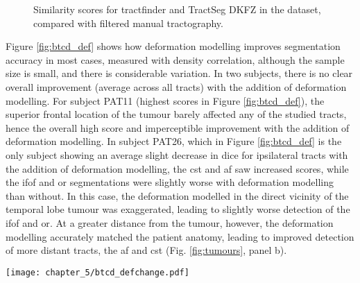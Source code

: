 \begin{figure}[htb!]
  \caption[Similarity scores against tractography for tractfinder and TractSeg in the BTC dataset]{Similarity scores for tractfinder and TractSeg DKFZ in the  dataset, compared with filtered manual tractography.}
  \label{fig:btcd_box}
\end{figure}

Figure \ref{fig:btcd_def} shows how deformation modelling improves segmentation accuracy in most cases, measured with density correlation, although the sample size is small, and there is considerable variation.
In two subjects, there is no clear overall improvement (average across all tracts) with the addition of deformation modelling.
For subject PAT11 (highest scores in Figure \ref{fig:btcd_def}), the superior frontal location of the tumour barely affected any of the studied tracts, hence the overall high score and imperceptible improvement with the addition of deformation modelling.
In subject PAT26, which in Figure \ref{fig:btcd_def} is the only subject showing an average slight decrease in \gls{dice} for ipsilateral tracts with the addition of deformation modelling, the \gls{cst} and \gls{af} saw increased scores, while the \gls{ifof} and \gls{or} segmentations were slightly worse with deformation modelling than without.
In this case, the deformation modelled in the direct vicinity of the temporal lobe tumour was exaggerated, leading to slightly worse detection of the \gls{ifof} and \gls{or}.
At a greater distance from the tumour, however, the deformation modelling accurately matched the patient anatomy, leading to improved detection of more distant tracts, the \gls{af} and \gls{cst} (Fig. \ref{fig:tumours}, panel b).

\begin{SCfigure}[][htb!]
  \texttt{[image: chapter\_5/btcd\_defchange.pdf]}
  \caption[Effect of deformation modelling in the BTC dataset]{Effect of deformation modelling on segmentation accuracy, compared with manually filtered targeted tractography. Each large datapoint represents the average across all tracts for a single subject, and is coloured according to the tumour side. Small datapoints represent individual tracts. In the one subject with a midline tumour, all tracts are considered ipsilateral.}
  \label{fig:btcd_def}
\end{SCfigure}
